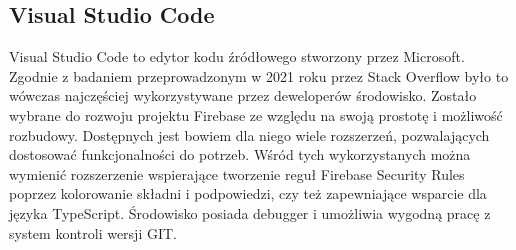 

\subsection{Visual Studio Code}
Visual Studio Code to edytor kodu źródłowego stworzony przez Microsoft. Zgodnie z badaniem przeprowadzonym w 2021 roku przez Stack Overflow \cite{stackoverflow-ankieta} było to wówczas najczęściej wykorzystywane przez deweloperów środowisko. Zostało wybrane do rozwoju projektu Firebase ze względu na swoją prostotę i możliwość rozbudowy. Dostępnych jest bowiem dla niego wiele rozszerzeń, pozwalających dostosować funkcjonalności do potrzeb. Wśród tych wykorzystanych można wymienić rozszerzenie wspierające tworzenie reguł Firebase Security Rules poprzez kolorowanie składni i podpowiedzi, czy też zapewniające wsparcie dla języka TypeScript. Środowisko posiada debugger i umożliwia wygodną pracę z system kontroli wersji GIT.
